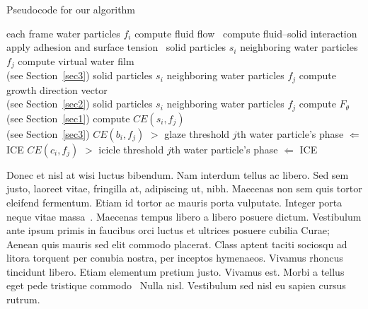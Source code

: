 \documentclass[AMS,STIX2COL]{WileyNJD-v2}
\begin{document}
    \begin{algorithm}
        \caption{Pseudocode for our algorithm}\label{alg1}
        \begin{algorithmic}
            \For
                each frame
                \For
                    water particles $f_{i}$
                    \State compute fluid flow~\cite{Rothermel1997}
                    \State compute fluid--solid interaction~\cite{Allen2011}
                    \State apply adhesion and surface tension~\cite{Ballen2011}
                \EndFor
                \For
                    solid particles $s_{i}$
                    \For
                        neighboring water particles $f_{j}$
                        \State compute virtual water film \\(see Section~\ref{sec3})
                    \EndFor
                \EndFor
                \For
                    solid particles $s_{i}$
                    \For
                        neighboring water particles $f_{j}$
                        \State compute growth direction vector \\(see Section~\ref{sec2})
                    \EndFor
                \EndFor
                \For
                    solid particles $s_{i}$
                    \For
                        neighboring water particles $f_{j}$
                        \State compute $F_{\theta}$ (see Section~\ref{sec1})
                        \State compute $CE(s_{i},f_{j})$ \\(see Section~\ref{sec3})
                        \If
                            $CE(b_{i}, f_{j})$ $>$ glaze threshold
                            \State $j$th water particle's phase $\Leftarrow$ ICE
                        \EndIf
                        \If
                            $CE(c_{i}, f_{j})$ $>$ icicle threshold
                            \State $j$th water particle's phase $\Leftarrow$ ICE
                        \EndIf
                    \EndFor
                \EndFor
            \EndFor
        \end{algorithmic}
    \end{algorithm}

    Donec et nisl at wisi luctus bibendum. Nam interdum tellus ac libero. Sed sem justo, laoreet vitae, fringilla at,
    adipiscing ut, nibh. Maecenas non sem quis tortor eleifend fermentum. Etiam id tortor ac mauris porta vulputate.
    Integer porta neque vitae massa~\cite{Rothermel1997,Elbaum2002}. Maecenas tempus libero a libero posuere dictum. Vestibulum ante ipsum primis in
    faucibus orci luctus et ultrices posuere cubilia Curae; Aenean quis mauris sed elit commodo placerat. Class aptent
    taciti sociosqu ad litora torquent per conubia nostra, per inceptos hymenaeos. Vivamus rhoncus tincidunt libero.
    Etiam elementum pretium justo. Vivamus est. Morbi a tellus eget pede tristique commodo~\cite{Elbaum2002} Nulla nisl. Vestibulum
    sed nisl eu sapien cursus rutrum.
\end{document}
